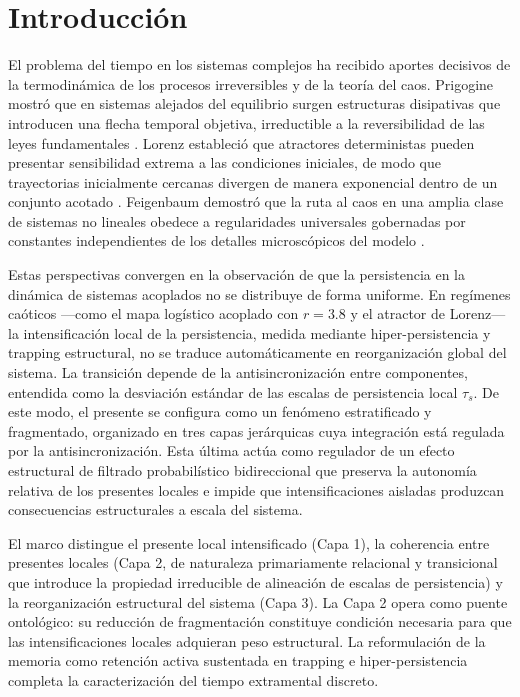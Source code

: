 \section{Introducción}

El problema del tiempo en los sistemas complejos ha recibido aportes decisivos de la termodinámica de los procesos irreversibles y de la teoría del caos. Prigogine mostró que en sistemas alejados del equilibrio surgen estructuras disipativas que introducen una flecha temporal objetiva, irreductible a la reversibilidad de las leyes fundamentales \citep{prigogine_being_to_becoming_1980,prigogine_stengers_order_out_chaos}. Lorenz estableció que atractores deterministas pueden presentar sensibilidad extrema a las condiciones iniciales, de modo que trayectorias inicialmente cercanas divergen de manera exponencial dentro de un conjunto acotado \citep{lorenz_deterministic_nonperiodic_1963}. Feigenbaum demostró que la ruta al caos en una amplia clase de sistemas no lineales obedece a regularidades universales gobernadas por constantes independientes de los detalles microscópicos del modelo \citep{feigenbaum_quantitative_universality_1978}.

Estas perspectivas convergen en la observación de que la persistencia en la dinámica de sistemas acoplados no se distribuye de forma uniforme. En regímenes caóticos —como el mapa logístico acoplado con $r=3.8$ y el atractor de Lorenz— la intensificación local de la persistencia, medida mediante hiper-persistencia y trapping estructural, no se traduce automáticamente en reorganización global del sistema. La transición depende de la antisincronización entre componentes, entendida como la desviación estándar de las escalas de persistencia local $\tau_s$. De este modo, el presente se configura como un fenómeno estratificado y fragmentado, organizado en tres capas jerárquicas cuya integración está regulada por la antisincronización. Esta última actúa como regulador de un efecto estructural de filtrado probabilístico bidireccional que preserva la autonomía relativa de los presentes locales e impide que intensificaciones aisladas produzcan consecuencias estructurales a escala del sistema.

El marco distingue el presente local intensificado (Capa 1), la coherencia entre presentes locales (Capa 2, de naturaleza primariamente relacional y transicional que introduce la propiedad irreducible de alineación de escalas de persistencia) y la reorganización estructural del sistema (Capa 3). La Capa 2 opera como puente ontológico: su reducción de fragmentación constituye condición necesaria para que las intensificaciones locales adquieran peso estructural. La reformulación de la memoria como retención activa sustentada en trapping e hiper-persistencia completa la caracterización del tiempo extramental discreto.